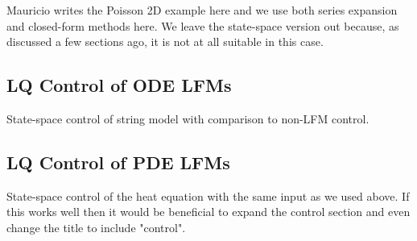 \documentclass[journal]{IEEEtran}
\newcommand{\simo}[1]{{\color{red}#1}}
\begin{document}
\simo{Mauricio writes the Poisson 2D example here and we use both series expansion and closed-form methods here. We leave the state-space version out because, as discussed a few sections ago, it is not at all suitable in this case.}

%

\subsection{LQ Control of ODE LFMs}

\simo{State-space control of string model with comparison to non-LFM control.}

\subsection{LQ Control of PDE LFMs}

\simo{State-space control of the heat equation with the same input as we used above. If this works well then it would be beneficial to expand the control section and even change the title to include "control".}


\end{document}
